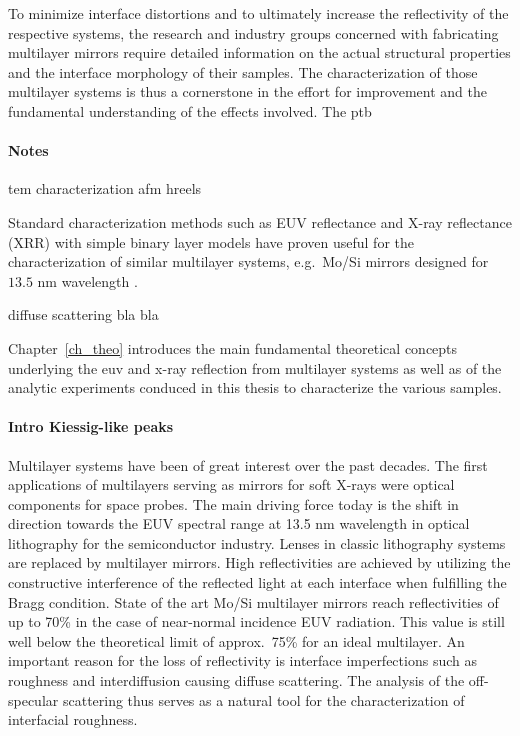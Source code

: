 To minimize interface distortions and to ultimately increase the reflectivity of the respective systems, the research and industry groups concerned with fabricating multilayer mirrors require detailed information on the actual structural properties and the interface morphology of their samples. The characterization of those multilayer systems is thus a cornerstone in the effort for improvement and the fundamental understanding of the effects involved. The \gls{ptb}
\paragraph{Notes}

\gls{tem} characterization \cite{stearns_thermally_1990, bajt_investigation_2001}
\gls{afm} \cite{binnig_atomic_1986,louis_progress_2000, bajt_investigation_2001}
\gls{hreels} \cite{egerton_electron_2011, prasciolu_thermal_2014}

Standard characterization methods such as EUV reflectance and X-ray reflectance 
(XRR) with simple binary layer models have proven useful for the 
characterization of similar multilayer systems, e.g.~Mo/Si mirrors designed for 
$13.5$ nm wavelength \cite{lim_fabrication_2001, bajt_investigation_2001, braun_mo/si_2002}.

diffuse scattering bla bla

Chapter~\ref{ch_theo} introduces the main fundamental theoretical concepts underlying the \gls{euv} and x-ray reflection from multilayer systems as well as of the analytic experiments conduced in this thesis to characterize the various samples.



\paragraph{Intro Kiessig-like peaks}
Multilayer systems have been of great interest over the past decades. The first applications of multilayers serving as mirrors for soft X-rays were optical components for space probes. The main driving force today is the shift in direction towards the EUV spectral range at 13.5 nm wavelength in optical lithography for the semiconductor industry. Lenses in classic lithography systems are replaced by multilayer mirrors. High  reflectivities are achieved by utilizing the constructive interference of the reflected light at each interface when fulfilling the Bragg condition. State of the art Mo/Si multilayer mirrors reach reflectivities of up to 70\% \cite{braun_mo/si_2002, feigl_euv_2006} in the case of near-normal incidence EUV radiation. This value is still well below the theoretical limit of approx.~75\% for an ideal multilayer. An important reason for the loss of reflectivity is interface imperfections such as roughness and interdiffusion causing diffuse scattering. The analysis of the off-
specular scattering 
thus serves as a 
natural tool for the characterization of interfacial roughness. 

